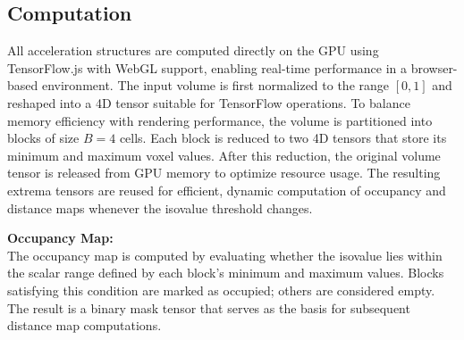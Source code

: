 \documentclass[conference]{IEEEtran}
\begin{document}
\subsection{Computation}

All acceleration structures are computed directly on the GPU using TensorFlow.js with WebGL support, enabling real-time performance in a browser-based environment. The input volume is first normalized to the range $[0,1]$ and reshaped into a 4D tensor suitable for TensorFlow operations. To balance memory efficiency with rendering performance, the volume is partitioned into blocks of size $B = 4$ cells. Each block is reduced to two 4D tensors that store its minimum and maximum voxel values. After this reduction, the original volume tensor is released from GPU memory to optimize resource usage. The resulting extrema tensors are reused for efficient, dynamic computation of occupancy and distance maps whenever the isovalue threshold changes.

\vspace{0.5em}
\noindent\textbf{Occupancy Map:} \\
The occupancy map is computed by evaluating whether the isovalue lies within the scalar range defined by each block’s minimum and maximum values. Blocks satisfying this condition are marked as occupied; others are considered empty. The result is a binary mask tensor that serves as the basis for subsequent distance map computations.
\end{document}
